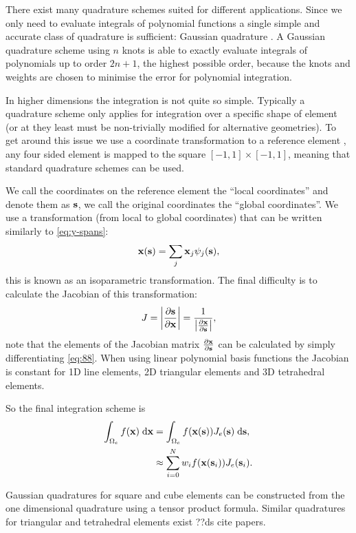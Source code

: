 {There exist many quadrature schemes suited for different applications.
Since we only need to evaluate integrals of polynomial functions a single simple and accurate class of quadrature is sufficient: Gaussian quadrature \cite[492]{Kincaid2002}.
A Gaussian quadrature scheme using $n$ knots is able to exactly evaluate integrals of polynomials up to order $2n + 1$, the highest possible order, because the knots and weights are chosen to minimise the error for polynomial integration.

In higher dimensions the integration is not quite so simple.
Typically a quadrature scheme only applies for integration over a specific shape of element (or at they least must be non-trivially modified for alternative geometries).
To get around this issue we use a coordinate transformation to a reference element \cite[29]{HowardElmanDavidSilvester2006}, \eg any four sided element is mapped to the square $[-1, 1] \times [-1, 1]$, meaning that standard quadrature schemes can be used.

We call the coordinates on the reference element the ``local coordinates'' and denote them as $\sv$, we call the original coordinates the ``global coordinates''.
We use a transformation (from local to global coordinates) that can be written similarly to \cref{eq:y-spans}:
\begin{equation}
  \xv(\sv) = \sum_j \xv_j \sbf_j(\sv),
\label{eq:88}
\end{equation}
this is known as an isoparametric transformation.
The final difficulty is to calculate the Jacobian of this transformation:
\begin{equation}
  J = \abs{ \pd{\sv}{\xv}} = \frac{1}{\abs{\pd{\xv}{\sv}}},
\end{equation}
note that the elements of the Jacobian matrix $\pd{\xv}{\sv}$ can be calculated by simply differentiating \cref{eq:88}.
When using linear polynomial basis functions the Jacobian is constant for 1D line elements, 2D triangular elements and 3D tetrahedral elements.

So the final integration scheme is
\begin{equation}
  \begin{aligned}
    \intdx[\magd_e]{f(\xv)} &= \intds[\magd_e]{f(\xv(\sv)) J_e(\sv)}, \\
    &\approx  \sum_{i=0}^N w_i f(\xv(\sv_i)) J_e(\sv_i).
  \end{aligned}
\end{equation}

Gaussian quadratures for square and cube elements can be constructed from the one dimensional quadrature using a tensor product formula.
Similar quadratures for triangular and tetrahedral elements exist \eg ??ds cite papers.




}
